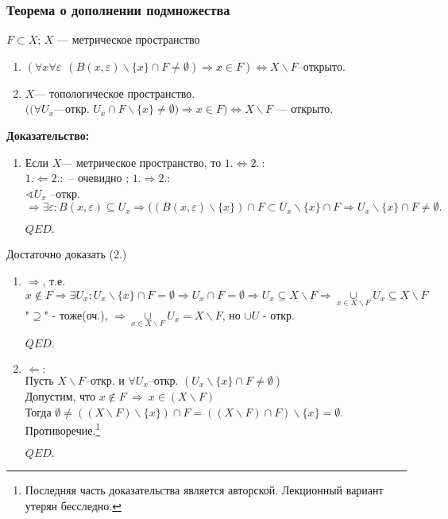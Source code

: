\documentclass{article}
\begin{document}
\begin{spacing}{1.5}
\subsubsection{Теорема о дополнении подмножества}
$F\subset X$;  $X$ --- метрическое пространство
\begin{enumerate}
\item $(\forall x \forall\varepsilon~~(B(x,\varepsilon)\backslash\lbrace x\rbrace\cap F\neq\emptyset)\Rightarrow x\in F)\Leftrightarrow X\backslash F$--открыто.
\item $X$--- топологическое пространство.\\
$((\forall U_{x}$---откр. $U_{x}\cap F\backslash\lbrace x\rbrace\neq \emptyset) \Rightarrow x\in F)\Longleftrightarrow X\backslash F$ --- открыто.
\end{enumerate}
\textbf{Доказательство:}
 \begin{enumerate}
 \item Если $X$--- метрическое пространство, то $1.\Longleftrightarrow 2.~:$
 \\ $ 1.\Leftarrow 2.:$ -- очевидно
 ; $ 1.\Rightarrow 2.:$
 \\$\sphericalangle U_{x}$ --откр. $\Rightarrow \exists\varepsilon: B(x, \varepsilon)\subseteq U_{x}\Rightarrow((B(x, \varepsilon)\backslash\lbrace x\rbrace ) \cap F\subset U_{x}\backslash\lbrace x\rbrace\cap F\Rightarrow U_{x}\backslash\lbrace x\rbrace\cap F\neq \emptyset.$
 \begin{flushright}
$QED.$
\end{flushright}
 \end{enumerate}
Достаточно доказать (2.)
 \begin{enumerate}
 \item $\Rightarrow$, т.е. $x\notin F \Rightarrow \exists U_{x}: U_{x}\backslash \lbrace x\rbrace\cap F=\emptyset\Rightarrow U_{x}\cap F=\emptyset\Rightarrow U_{x}\subseteq X\backslash F\Rightarrow \underset{x\in X\backslash F}{\cup}U_{x}\subseteq X\backslash F  $
 "$\supseteq$" - тоже(оч.), $\Rightarrow\underset{x\in X\backslash F}{\cup}U_{x}= X\backslash F$, но $\cup U$ - откр.
 \begin{flushright}
$QED.$
\end{flushright}
\item $\Leftarrow :$
\\ Пусть $X\backslash F$--откр. и $\forall U_{x}$--откр.   $(U_{x}\backslash\lbrace x\rbrace\cap F\neq\emptyset)$ 
\\Допустим, что $x\notin F~\Rightarrow ~ x\in (X\backslash F)$
\\Тогда $\emptyset \neq ((X\backslash F)\backslash\lbrace x\rbrace)\cap F = ((X\backslash F)\cap F)\backslash \lbrace x\rbrace = \emptyset.$ Противоречие.\footnote{Последняя часть доказательства является авторской. Лекционный вариант утерян бесследно.}
 \begin{flushright}
$QED.$
\end{flushright}
  \end{enumerate}
  
\end{spacing}
\end{document}
